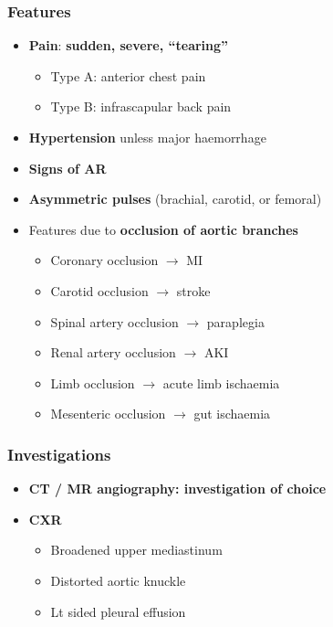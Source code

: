 \documentclass[
  12pt,
]{memoir}
\providecommand{\tightlist}{%
  \setlength{\itemsep}{0pt}\setlength{\parskip}{0pt}}
\begin{document}
\hypertarget{features-4}{%
\subsubsection{Features}\label{features-4}}

\begin{itemize}
\tightlist
\item
  \textbf{Pain}: \textbf{sudden, severe, ``tearing''}

  \begin{itemize}
  \tightlist
  \item
    Type A: anterior chest pain
  \item
    Type B: infrascapular back pain
  \end{itemize}
\item
  \textbf{Hypertension} unless major haemorrhage
\item
  \textbf{Signs of AR}
\item
  \textbf{Asymmetric pulses} (brachial, carotid, or femoral)
\item
  Features due to \textbf{occlusion of aortic branches}

  \begin{itemize}
  \tightlist
  \item
    Coronary occlusion \(\rightarrow\) MI
  \item
    Carotid occlusion \(\rightarrow\) stroke
  \item
    Spinal artery occlusion \(\rightarrow\) paraplegia
  \item
    Renal artery occlusion \(\rightarrow\) AKI
  \item
    Limb occlusion \(\rightarrow\) acute limb ischaemia
  \item
    Mesenteric occlusion \(\rightarrow\) gut ischaemia
  \end{itemize}
\end{itemize}

\hypertarget{investigations-5}{%
\subsubsection{Investigations}\label{investigations-5}}

\begin{itemize}
\tightlist
\item
  \textbf{CT / MR angiography: investigation of choice}
\item
  \textbf{CXR}

  \begin{itemize}
  \tightlist
  \item
    Broadened upper mediastinum
  \item
    Distorted aortic knuckle
  \item
    Lt sided pleural effusion
  \end{itemize}
\end{itemize}
\end{document}
